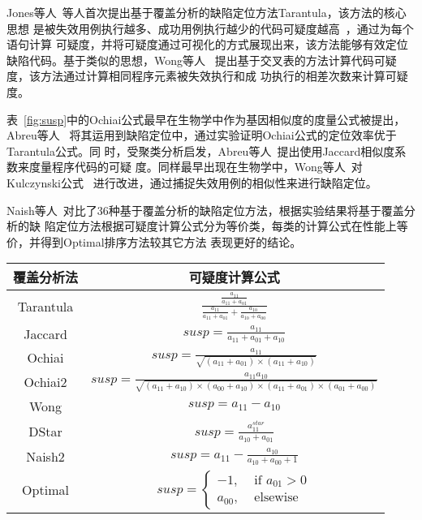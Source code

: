 Jones等人~\cite{jones2005empirical}等人首次提出基于覆盖分析的缺陷定位方法Tarantula，该方法的核心思想
是被失效用例执行越多、成功用例执行越少的代码可疑度越高~\cite{jones2005empirical}，通过为每个语句计算
可疑度，并将可疑度通过可视化的方式展现出来，该方法能够有效定位缺陷代码。基于类似的思想，Wong等人
~\cite{wong2008crosstab}提出基于交叉表的方法计算代码可疑度，该方法通过计算相同程序元素被失效执行和成
功执行的相差次数来计算可疑度。

表~\ref{fig:susp}中的Ochiai公式最早在生物学中作为基因相似度的度量公式被提出，Abreu等人
~\cite{abreu2007accuracy}将其运用到缺陷定位中，通过实验证明Ochiai公式的定位效率优于Tarantula公式。同
时，受聚类分析启发，Abreu等人~\cite{abreu2007accuracy}提出使用Jaccard相似度系数来度量程序代码的可疑
度。同样最早出现在生物学中，Wong等人~\cite{wong2014dstar}对Kulczynski公式
~\cite{willett2003similarity}进行改进，通过捕捉失效用例的相似性来进行缺陷定位。

Naish等人~\cite{naish2011model}对比了36种基于覆盖分析的缺陷定位方法，根据实验结果将基于覆盖分析的缺
陷定位方法根据可疑度计算公式分为等价类，每类的计算公式在性能上等价，并得到Optimal排序方法较其它方法
表现更好的结论。

\begin{center}
\zihaowu
{}\label{fig:susp}
\begin{tabular}{cc}
\toprule
覆盖分析法 & 可疑度计算公式 \\ \midrule
Tarantula & $\frac{\frac{a_{11}}{a_{11}+a_{01}}}{\frac{a_{11}}{a_{11}+a_{01}}+\frac{a_{10}}{a_{10}+a_{00}}}$\\ 
Jaccard & $susp = \frac{a_{11}}{a_{11}+a_{01}+a_{10}}$\\ 
Ochiai & $susp = \frac{a_{11}}{\sqrt{(a_{11}+a_{01})\times(a_{11}+a_{10})}}$\\
Ochiai2 & $susp = \frac{a_{11}a_{10}}{\sqrt{(a_{11}+a_{10})\times (a_{00}+a_{10})\times (a_{11}+a_{01})\times (a_{01}+a_{00})}}$\\ 
Wong & $susp = a_{11}-a_{10}$\\
DStar & $susp = \frac{a_{11}^{star}}{a_{10}+a_{01}}$\\ 
Naish2 & $susp = a_{11}-\frac{a_{10}}{a_{10}+a_{00}+1}$ \\
Optimal & $susp = \begin{cases}
  -1, & \text{ if } a_{01}>0 \\ 
  a_{00}, & \text{ elsewise }  
  \end{cases}$\\ 
  \bottomrule
\end{tabular}
\end{center}

